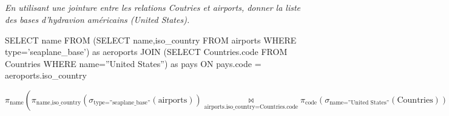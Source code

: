 \documentclass[10pt,fleqn]{article} %
\begin{document}
\subparagraph{}
\textit{En utilisant une jointure entre les relations Coutries et airports, donner la liste des bases d'hydravion américains (United States). }

\ifprof
\begin{corrige}
\begin{envsql}
\begin{sql}
SELECT name FROM 
	(SELECT name,iso_country FROM airports WHERE type='seaplane_base') as aeroports
	JOIN
	(SELECT Countries.code FROM Countries WHERE name=''United States'') as pays 
	ON pays.code = aeroports.iso_country
\end{sql}
\end{envsql}
$$
\pi_{\text{name}}\left(
	\pi_{\text{name,iso\_country}} \left(
		\sigma_{\text{type=''seaplane\_base''}}\left( \text{airports}\right)\right)
	\underset{\text{airports.iso\_country}=\text{Countries.code}}{\bowtie }		
	\pi_{\text{code}} \left(
		\sigma_{\text{name=''United States''}}\left( \text{Countries}\right)\right)\right)
$$
\end{corrige}\else
\fi
%
%
%
%

\end{document}
